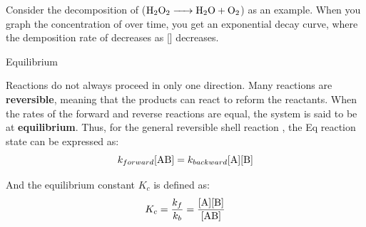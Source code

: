 \documentclass[10pt]{article}
\begin{document}
  Consider the decomposition of  ($\ce{H2O2 -> H2O + O2}$) as an example. When you graph the concentration of  over time, you get an exponential decay curve, where the demposition rate of  decreases as [] decreases.


  \begin{core}[label=placeholder2]{Equilibrium}
    
    Reactions do not always proceed in only one direction. Many reactions are \textbf{reversible}, meaning that the products can react to reform the reactants. When the rates of the forward and reverse reactions are equal, the system is said to be at \textbf{equilibrium}. Thus, for the general reversible shell reaction , the Eq reaction state can be expressed as:
    \[
      k_{forward}[\ce{AB}] = k_{backward}[\ce{A}][\ce{B}]
    \]

    And the equilibrium constant $K_c$ is defined as:
    \[
      K_c = \frac{k_f}{k_b} = \frac{[\ce{A}][\ce{B}]}{[\ce{AB}]}
    \]

  \end{core}
\end{document}

